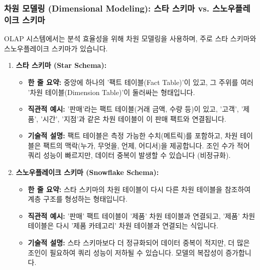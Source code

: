 \documentclass[11pt,a4paper]{article}
\begin{document}
\subsubsection{차원 모델링 (Dimensional Modeling): 스타 스키마 vs. 스노우플레이크 스키마}
OLAP 시스템에서는 분석 효율성을 위해 차원 모델링을 사용하며, 주로 스타 스키마와 스노우플레이크 스키마가 있습니다.

\begin{enumerate}
    \item \textbf{스타 스키마 (Star Schema):}
    \begin{itemize}
        \item \textbf{한 줄 요약:} 중앙에 하나의 '팩트 테이블(Fact Table)'이 있고, 그 주위를 여러 '차원 테이블(Dimension Table)'이 둘러싸는 형태입니다.
        \item \textbf{직관적 예시:} '판매'라는 팩트 테이블(거래 금액, 수량 등)이 있고, '고객', '제품', '시간', '지점'과 같은 차원 테이블이 이 판매 팩트와 연결됩니다.
        \item \textbf{기술적 설명:} 팩트 테이블은 측정 가능한 수치(메트릭)를 포함하고, 차원 테이블은 팩트의 맥락(누가, 무엇을, 언제, 어디서)을 제공합니다. 조인 수가 적어 쿼리 성능이 빠르지만, 데이터 중복이 발생할 수 있습니다 (비정규화).
    \end{itemize}

    \item \textbf{스노우플레이크 스키마 (Snowflake Schema):}
    \begin{itemize}
        \item \textbf{한 줄 요약:} 스타 스키마의 차원 테이블이 다시 다른 차원 테이블을 참조하여 계층 구조를 형성하는 형태입니다.
        \item \textbf{직관적 예시:} '판매' 팩트 테이블이 '제품' 차원 테이블과 연결되고, '제품' 차원 테이블은 다시 '제품 카테고리' 차원 테이블과 연결되는 식입니다.
        \item \textbf{기술적 설명:} 스타 스키마보다 더 정규화되어 데이터 중복이 적지만, 더 많은 조인이 필요하여 쿼리 성능이 저하될 수 있습니다. 모델의 복잡성이 증가합니다.
    \end{itemize}
\end{enumerate}
\end{document}
